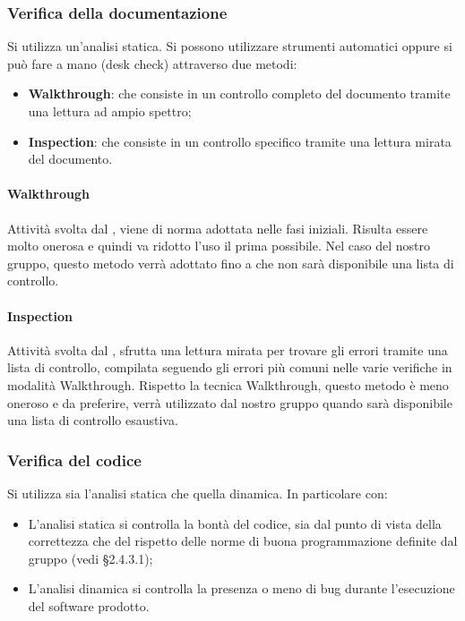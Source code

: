 \subsubsection{Verifica della documentazione}
Si utilizza un'analisi statica. Si possono utilizzare strumenti automatici oppure si può fare a mano (desk check) attraverso due metodi:
\begin{itemize}
\item \textbf{Walkthrough}: che consiste in un controllo completo del documento tramite una lettura ad ampio spettro;
\item \textbf{Inspection}: che consiste in un controllo specifico tramite una lettura mirata del documento.
\end{itemize}

\paragraph{Walkthrough}
Attività svolta dal \VE{}, viene di norma adottata nelle fasi iniziali. Risulta essere molto onerosa e quindi va ridotto l'uso il prima possibile. Nel caso del nostro gruppo, questo metodo verrà adottato fino a che non sarà disponibile una lista di controllo.

\paragraph{Inspection}
Attività svolta dal \VE{}, sfrutta una lettura mirata per trovare gli errori tramite una lista di controllo, compilata seguendo gli errori più comuni nelle varie verifiche in modalità Walkthrough. Rispetto la tecnica Walkthrough, questo metodo è meno oneroso e da preferire, verrà utilizzato dal nostro gruppo quando sarà disponibile una lista di controllo esaustiva.


\subsubsection{Verifica del codice}
Si utilizza sia l'analisi statica che quella dinamica. In particolare con:
\begin{itemize}
\item L'analisi statica si controlla la bontà del codice, sia dal punto di vista della correttezza che del rispetto delle norme di buona programmazione definite dal gruppo (vedi §2.4.3.1);
\item L'analisi dinamica si controlla la presenza o meno di bug durante l'esecuzione del software prodotto.
\end{itemize}


